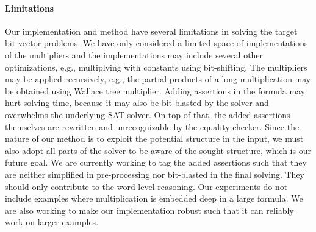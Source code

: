 
%

\paragraph{\bf Limitations}
%
Our implementation and method have several limitations
in solving the target bit-vector problems.
%
We have only considered a limited space of implementations of the
multipliers and the implementations may include several other
optimizations, e.g., multiplying with constants using bit-shifting.
%
The multipliers may be applied recursively, e.g.,
the partial products of a long multiplication may be
obtained using Wallace tree multiplier.
%
Adding assertions in the formula may hurt solving time, because
it may also be bit-blasted by the solver and overwhelms
the underlying SAT solver. 
%
On top of that, the added assertions themselves are rewritten and
unrecognizable by the equality checker.
%
Since the nature of our method is to exploit the potential
structure in the input, we must also adopt all parts of the solver
to be aware of the sought structure, which is our future goal.
%
We are currently working to tag the added assertions such that they
are neither simplified in pre-processing nor bit-blasted in the final
solving.
%
They should only contribute to the word-level reasoning.
%
Our experiments do not include examples where multiplication
is embedded deep in a large formula.
%
We are also working to make our implementation robust such that
it can reliably work on larger examples.







